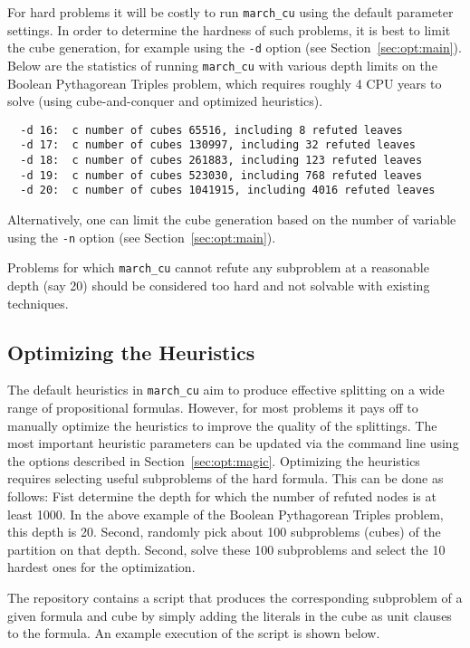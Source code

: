 \documentclass{llncs}
\begin{document}
For hard problems it will be costly to run {\tt march\_cu} using the default parameter settings. In order to determine the hardness 
of such problems, it is best to limit the cube generation, for example using the {\tt -d} option (see Section~\ref{sec:opt:main}).
Below are the statistics of running {\tt march\_cu} with various depth limits on the Boolean Pythagorean Triples problem, which requires roughly 4 CPU
years to solve (using cube-and-conquer and optimized heuristics). 
%
\begin{verbatim}
  -d 16:  c number of cubes 65516, including 8 refuted leaves
  -d 17:  c number of cubes 130997, including 32 refuted leaves
  -d 18:  c number of cubes 261883, including 123 refuted leaves
  -d 19:  c number of cubes 523030, including 768 refuted leaves
  -d 20:  c number of cubes 1041915, including 4016 refuted leaves
\end{verbatim}
%
Alternatively, one can limit the cube generation based on the number of variable using the {\tt -n} option (see Section~\ref{sec:opt:main}).

Problems for which {\tt march\_cu} cannot refute any subproblem at a reasonable depth (say 20) should be considered too hard
and not solvable with existing techniques. 

\subsection{Optimizing the Heuristics}

The default heuristics in {\tt march\_cu} aim to produce effective splitting on a wide range of propositional formulas. However, for 
most problems it pays off to manually optimize the heuristics to improve the quality of the splittings. The most important 
heuristic parameters can be updated via the command line using the options described in Section~\ref{sec:opt:magic}.
Optimizing the heuristics requires selecting useful subproblems of the hard formula.
This can be done as follows: Fist determine the depth for which the number of refuted nodes is at least 1000. In the above example
of the Boolean Pythagorean Triples problem, this depth is 20. Second, randomly pick about 100 subproblems (cubes) of the partition on that depth.
Second, solve these 100 subproblems and select the 10 hardest ones for the optimization.

The repository contains a script that produces the corresponding subproblem of a given formula and cube by simply adding
the literals in the cube as unit clauses to the formula. An example execution of the script is shown below.
\end{document}
